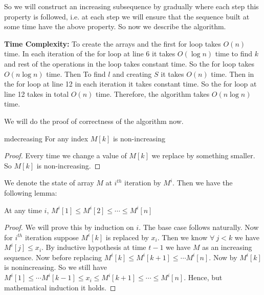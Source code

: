 So we will construct an increasing subsequence by gradually where each step this property is followed, i.e. at each step we will ensure that the sequence built at some time have the above property. So now we describe the algorithm. 
\begin{algorithm}
	\DontPrintSemicolon
\caption{$(A)$}
\end{algorithm}\parinf

\textbf{Time Complexity:} To create the arrays and the first for loop takes $O(n)$ time. In each iteration of the for loop at line 6 it takes $O(\log n)$ time to find $k$ and rest of the operations in the loop takes constant time. So the for loop takes $O(n\log n)$ time.  Then To find $l$ and creating $S$ it takes $O(n)$ time. Then in the for loop at line 12 in each iteration it takes constant time. So the for loop at line 12 takes in total $O(n)$ time. Therefore, the algorithm takes $O(n\log n)$ time. \parinn

We will do the proof of correctness of the algorithm now.
\begin{lemma}{}{mdecreasing}
	For any index $M[k]$ is non-increasing
\end{lemma}
\begin{proof}
	Every time we change a value of $M[k]$ we replace by something smaller. So $M[k]$ is non-increasing.
\end{proof}
We denote the state of array $M$ at $i^{th}$ iteration by $M^i$. Then we have the following lemma:

\begin{lemma}{}{}
At any time $i$, $M^i[1]\leq M^i[2]\leq \cdots\leq M^i[n]$
\end{lemma}
\begin{proof}
We will prove this by induction on $i$. The base case follows naturally. Now for $i^{th}$ iteration suppose $M^i[k]$ is replaced by $x_i$. Then we know $\forall \ j<k$ we have $M^i[j]\leq x_i$. By inductive hypothesis at time $t-1$ we have $M$ as an increasing sequence. Now before replacing $M^i[k]\leq M^i[k+1]\leq \cdots M^i[n]$. Now by  $M^i[k]$ is nonincreasing. So we still have $M^i[1]\leq \cdots M^i[k-1]\leq x_i\leq M^i[k+1]\leq \cdots \leq M^i[n]$. Hence, but mathematical induction it holds.
\end{proof}

